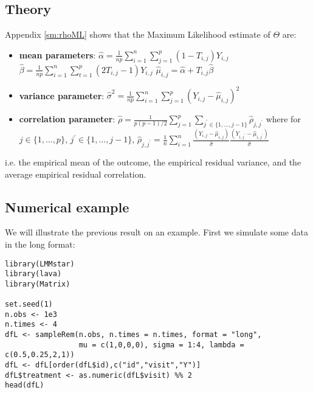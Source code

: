 \documentclass[12pt]{article}
\begin{document}
\subsection{Theory}
\label{sec:org396c4db}

Appendix \ref{sm:rhoML} shows that the Maximum Likelihood estimate of \(\Theta\) are:
\begin{itemize}
\item \textbf{mean parameters}: \(\widehat{\alpha}= \frac{1}{np} \sum_{i=1}^n
  \sum_{j=1}^p (1-T_{i,j}) Y_{i,j}\) \newline
{} \(\widehat{\beta}=
  \frac{1}{np} \sum_{i=1}^n \sum_{t=1}^p (2 T_{i,j}-1) Y_{i,j}\) \newline
{} \(\widehat{\mu}_{i,j} = \widehat{\alpha} + T_{i,j}\widehat{\beta}\)
\item \textbf{variance parameter}: \(\widehat{\sigma}^2 =
  \frac{1}{np}\sum_{i=1}^n\sum_{j=1}^p (Y_{i,j}-\widehat{\mu}_{i,j})^2\)
\item \textbf{correlation parameter}: \(\widehat{\rho} =
  \frac{1}{p(p-1)/2}\sum_{j=1}^p \sum_{j^{\prime} \in
  \{1,\ldots,j-1\}}\widehat{\rho}_{j,j^{\prime}}\) \newline where for
\(j \in \{1,\ldots,p\}\), \(j^{\prime} \in \{1,\ldots,j-1\}\),
\(\widehat{\rho}_{j,j^{\prime}} = \frac{1}{n}\sum_{i=1}^n
  \frac{(Y_{i,j}-\widehat{\mu}_{i,j})}{\widehat{\sigma}}\frac{(Y_{i,j^{\prime}}-\widehat{\mu}_{i,j^{\prime}})}{\widehat{\sigma}}\)
\end{itemize}
i.e. the empirical mean of the outcome, the empirical residual
variance, and the average empirical residual correlation.

\subsection{Numerical example}
\label{sec:org4454f6a}

We will illustrate the previous result on an example. First we
simulate some data in the long format:
\lstset{language=r,label= ,caption= ,captionpos=b,numbers=none}
\begin{lstlisting}
library(LMMstar)
library(lava)
library(Matrix)

set.seed(1)
n.obs <- 1e3
n.times <- 4
dfL <- sampleRem(n.obs, n.times = n.times, format = "long",
                 mu = c(1,0,0,0), sigma = 1:4, lambda = c(0.5,0.25,2,1))
dfL <- dfL[order(dfL$id),c("id","visit","Y")]
dfL$treatment <- as.numeric(dfL$visit) %% 2
head(dfL)
\end{lstlisting}
\end{document}
